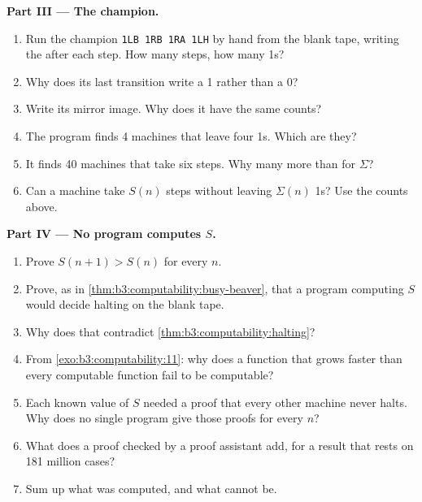 \begin{problem}
\medskip\noindent\textbf{Part III --- The champion.}
\begin{enumerate}[resume]
  \item Run the champion \texttt{1LB 1RB 1RA 1LH} by hand from the blank tape, writing the  after each step. How many steps, how many 1s?
  \item Why does its last transition write a 1 rather than a 0?
  \item Write its mirror image. Why does it have the same counts?
  \item The program finds 4 machines that leave four 1s. Which are they?
  \item It finds 40 machines that take six steps. Why many more than for $\Sigma$?
  \item Can a machine take $S(n)$ steps without leaving $\Sigma(n)$ 1s? Use the counts above.
\end{enumerate}

\medskip\noindent\textbf{Part IV --- No program computes $S$.}
\begin{enumerate}[resume]
  \item Prove $S(n + 1) > S(n)$ for every $n$.
  \item Prove, as in \cref{thm:b3:computability:busy-beaver}, that a program computing $S$ would decide halting on the blank tape.
  \item Why does that contradict \cref{thm:b3:computability:halting}?
  \item From \cref{exo:b3:computability:11}: why does a function that grows faster than every computable function fail to be computable?
  \item Each known value of $S$ needed a proof that every other machine never halts. Why does no single program give those proofs for every $n$?
  \item What does a proof checked by a proof assistant add, for a result that rests on 181 million cases?
  \item Sum up what was computed, and what cannot be.
\end{enumerate}
\end{problem}

